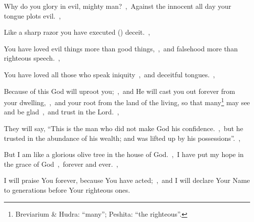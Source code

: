 \documentclass[12pt,twoside,a5paper]{article}
\begin{document}

\begin{normalparskip}
  Why do you glory in evil, mighty man?~\sep\ Against the innocent all day your tongue plots evil.~\sep


  Like a sharp razor you have executed () deceit.~\sep

  You have loved evil things more than good things,~\sep\ and falsehood more than righteous speech.~\sep

  You have loved all those who speak iniquity~\sep\ and deceitful tongues.~\sep

  Because of this God will uproot you;~\sep\ and He will cast you out forever from your dwelling,~\sep\ and your root from the land of the living, so that many\footnote{Breviarium \& Hudra: ``many''; Peshita: ``the righteous''.} may see and be glad~\sep\ and trust in the Lord.~\sep

  They will say, ``This is the man who did not make God his confidence.~\sep\ but he trusted in the abundance of his wealth; and was lifted up by his possessions''.~\sep

  But I am like a glorious olive tree in the house of God.~\sep\ I have put my hope in the grace of God~\sep\ forever and ever.~\sep

  I will praise You forever, because You have acted;~\sep\ and I will declare Your Name to generations before Your righteous ones.
\end{normalparskip}



\end{document}
